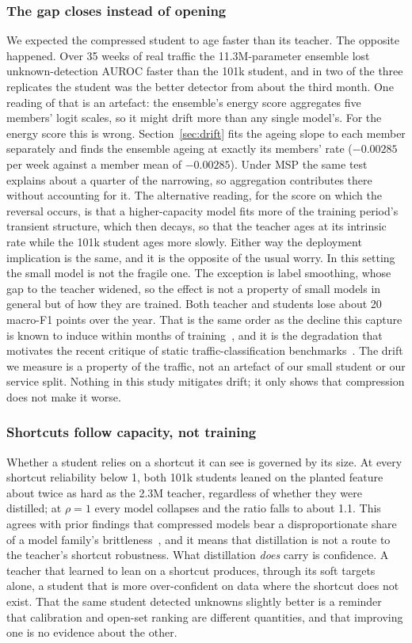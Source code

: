 \documentclass[journal]{IEEEtran}
\begin{document}
\subsubsection*{The gap closes instead of opening}
We expected the compressed student to age faster than its teacher. The opposite happened. Over 35 weeks of real traffic the 11.3M-parameter ensemble lost unknown-detection AUROC faster than the 101k student, and in two of the three replicates the student was the better detector from about the third month. One reading of that is an artefact: the ensemble's energy score aggregates five members' logit scales, so it might drift more than any single model's. For the energy score this is wrong. Section~\ref{sec:drift} fits the ageing slope to each member separately and finds the ensemble ageing at exactly its members' rate ($-0.00285$ per week against a member mean of $-0.00285$). Under MSP the same test explains about a quarter of the narrowing, so aggregation contributes there without accounting for it. The alternative reading, for the score on which the reversal occurs, is that a higher-capacity model fits more of the training period's transient structure, which then decays, so that the teacher ages at its intrinsic rate while the 101k student ages more slowly. Either way the deployment implication is the same, and it is the opposite of the usual worry. In this setting the small model is not the fragile one. The exception is label smoothing, whose gap to the teacher widened, so the effect is not a property of small models in general but of how they are trained. Both teacher and students lose about 20 macro-F1 points over the year. That is the same order as the decline this capture is known to induce within months of training~\cite{luxemburk2024year22}, and it is the degradation that motivates the recent critique of static traffic-classification benchmarks~\cite{ntccrisis}. The drift we measure is a property of the traffic, not an artefact of our small student or our service split. Nothing in this study mitigates drift; it only shows that compression does not make it worse.

\subsubsection*{Shortcuts follow capacity, not training}
Whether a student relies on a shortcut it can see is governed by its size. At every shortcut reliability below 1, both 101k students leaned on the planted feature about twice as hard as the 2.3M teacher, regardless of whether they were distilled; at $\rho=1$ every model collapses and the ratio falls to about 1.1. This agrees with prior findings that compressed models bear a disproportionate share of a model family's brittleness~\cite{hooker2020}, and it means that distillation is not a route to the teacher's shortcut robustness. What distillation \emph{does} carry is confidence. A teacher that learned to lean on a shortcut produces, through its soft targets alone, a student that is more over-confident on data where the shortcut does not exist. That the same student detected unknowns slightly better is a reminder that calibration and open-set ranking are different quantities, and that improving one is no evidence about the other.
\end{document}
